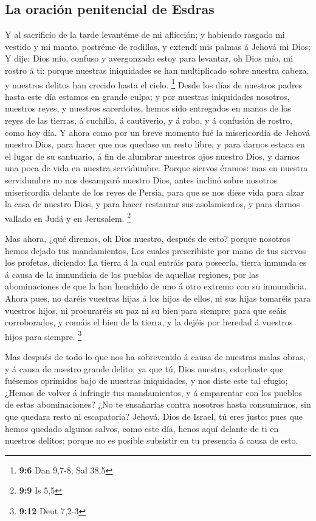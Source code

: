 \hypertarget{la-oraciuxf3n-penitencial-de-esdras}{%
\subsection{La oración penitencial de
Esdras}\label{la-oraciuxf3n-penitencial-de-esdras}}

 Y al sacrificio de la tarde levantéme de mi aflicción; y
habiendo rasgado mi vestido y mi manto, postréme de rodillas, y extendí
mis palmas á Jehová mi Dios;  Y dije: Dios mío, confuso y
avergonzado estoy para levantar, oh Dios mío, mi rostro á ti: porque
nuestras iniquidades se han multiplicado sobre nuestra cabeza, y
nuestros delitos han crecido hasta el cielo. \footnote{\textbf{9:6} Dan
  9,7-8; Sal 38,5}  Desde los días de nuestros padres hasta
este día estamos en grande culpa; y por nuestras iniquidades nosotros,
nuestros reyes, y nuestros sacerdotes, hemos sido entregados en manos de
los reyes de las tierras, á cuchillo, á cautiverio, y á robo, y á
confusión de rostro, como hoy día.  Y ahora como por un
breve momento fué la misericordia de Jehová nuestro Dios, para hacer que
nos quedase un resto libre, y para darnos estaca en el lugar de su
santuario, á fin de alumbrar nuestros ojos nuestro Dios, y darnos una
poca de vida en nuestra servidumbre.  Porque siervos éramos:
mas en nuestra servidumbre no nos desamparó nuestro Dios, antes inclinó
sobre nosotros misericordia delante de los reyes de Persia, para que se
nos diese vida para alzar la casa de nuestro Dios, y para hacer
restaurar sus asolamientos, y para darnos vallado en Judá y en
Jerusalem. \footnote{\textbf{9:9} Is 5,5}

 Mas ahora, ¿qué diremos, oh Dios nuestro, después de esto?
porque nosotros hemos dejado tus mandamientos,  Los cuales
prescribiste por mano de tus siervos los profetas, diciendo: La tierra á
la cual entráis para poseerla, tierra inmunda es á causa de la
inmundicia de los pueblos de aquellas regiones, por las abominaciones de
que la han henchido de uno á otro extremo con su inmundicia.
 Ahora pues, no daréis vuestras hijas á los hijos de ellos,
ni sus hijas tomaréis para vuestros hijos, ni procuraréis su paz ni su
bien para siempre; para que seáis corroborados, y comáis el bien de la
tierra, y la dejéis por heredad á vuestros hijos para siempre.
\footnote{\textbf{9:12} Deut 7,2-3}

 Mas después de todo lo que nos ha sobrevenido á causa de
nuestras malas obras, y á causa de nuestro grande delito; ya que tú,
Dios nuestro, estorbaste que fuésemos oprimidos bajo de nuestras
iniquidades, y nos diste este tal efugio;  ¿Hemos de volver
á infringir tus mandamientos, y á emparentar con los pueblos de estas
abominaciones? ¿No te ensañarías contra nosotros hasta consumirnos, sin
que quedara resto ni escapatoria?  Jehová, Dios de Israel,
tú eres justo: pues que hemos quedado algunos salvos, como este día,
henos aquí delante de ti en nuestros delitos; porque no es posible
subsistir en tu presencia á causa de esto.

